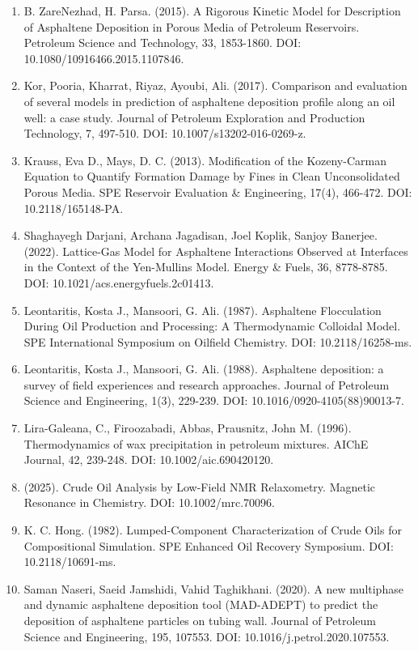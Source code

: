 \documentclass[11pt]{extarticle}
\begin{document}
\begin{enumerate}
\item
  B. ZareNezhad, H. Parsa. (2015). A Rigorous Kinetic Model for Description of Asphaltene Deposition in Porous Media of Petroleum Reservoirs. Petroleum Science and Technology, 33, 1853-1860. DOI: 10.1080/10916466.2015.1107846.
\item
  Kor, Pooria, Kharrat, Riyaz, Ayoubi, Ali. (2017). Comparison and evaluation of several models in prediction of asphaltene deposition profile along an oil well: a case study. Journal of Petroleum Exploration and Production Technology, 7, 497-510. DOI: 10.1007/s13202-016-0269-z.
\item
  Krauss, Eva D., Mays, D. C. (2013). Modification of the Kozeny-Carman Equation to Quantify Formation Damage by Fines in Clean Unconsolidated Porous Media. SPE Reservoir Evaluation \& Engineering, 17(4), 466-472. DOI: 10.2118/165148-PA.
\item
  Shaghayegh Darjani, Archana Jagadisan, Joel Koplik, Sanjoy Banerjee. (2022). Lattice-Gas Model for Asphaltene Interactions Observed at Interfaces in the Context of the Yen-Mullins Model. Energy \& Fuels, 36, 8778-8785. DOI: 10.1021/acs.energyfuels.2c01413.
\item
  Leontaritis, Kosta J., Mansoori, G. Ali. (1987). Asphaltene Flocculation During Oil Production and Processing: A Thermodynamic Colloidal Model. SPE International Symposium on Oilfield Chemistry. DOI: 10.2118/16258-ms.
\item
  Leontaritis, Kosta J., Mansoori, G. Ali. (1988). Asphaltene deposition: a survey of field experiences and research approaches. Journal of Petroleum Science and Engineering, 1(3), 229-239. DOI: 10.1016/0920-4105(88)90013-7.
\item
  Lira-Galeana, C., Firoozabadi, Abbas, Prausnitz, John M. (1996). Thermodynamics of wax precipitation in petroleum mixtures. AIChE Journal, 42, 239-248. DOI: 10.1002/aic.690420120.
\item
  (2025). Crude Oil Analysis by Low-Field NMR Relaxometry. Magnetic Resonance in Chemistry. DOI: 10.1002/mrc.70096.
\item
  K. C. Hong. (1982). Lumped-Component Characterization of Crude Oils for Compositional Simulation. SPE Enhanced Oil Recovery Symposium. DOI: 10.2118/10691-ms.
\item
  Saman Naseri, Saeid Jamshidi, Vahid Taghikhani. (2020). A new multiphase and dynamic asphaltene deposition tool (MAD-ADEPT) to predict the deposition of asphaltene particles on tubing wall. Journal of Petroleum Science and Engineering, 195, 107553. DOI: 10.1016/j.petrol.2020.107553.

\end{enumerate}
\end{document}
